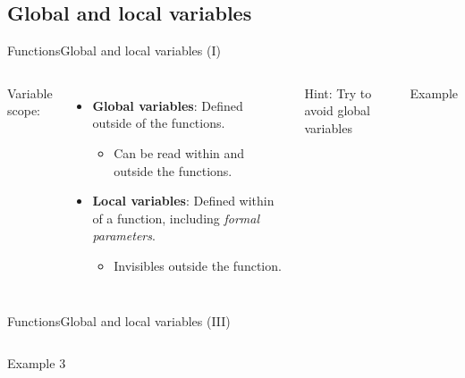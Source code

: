 \documentclass[10pt,compress]{beamer} %
\begin{document}
\subsection{Global and local variables}
\begin{frame}{Functions}{Global and local variables (I)}
\begin{columns}
	Variable scope:
		\begin{itemize}
		\item \small \textbf{Global variables}: Defined outside of the functions. 
		\begin{itemize}
		\item Can be read  within and outside the functions.
		\end{itemize}
		\item \small \textbf{Local variables}: Defined within of a function, including \textit{formal parameters}.
		\begin{itemize}
		\item Invisibles outside the function.
		\end{itemize}
		\end{itemize}

        \alert{Hint: Try to avoid global variables}
		\begin{block}{Example}
		\vspace{-0.2cm}
		
		\vspace{-0.2cm}
		\end{block}
	\end{columns}
\end{frame}

\begin{frame}{Functions}{Global and local variables (III)}

    \begin{columns}
		\begin{exampleblock}{Example 3}
		\vspace{-0.2cm}
		
		\vspace{-0.2cm}
		\end{exampleblock}
	\end{columns}

\end{frame}
\end{document}
